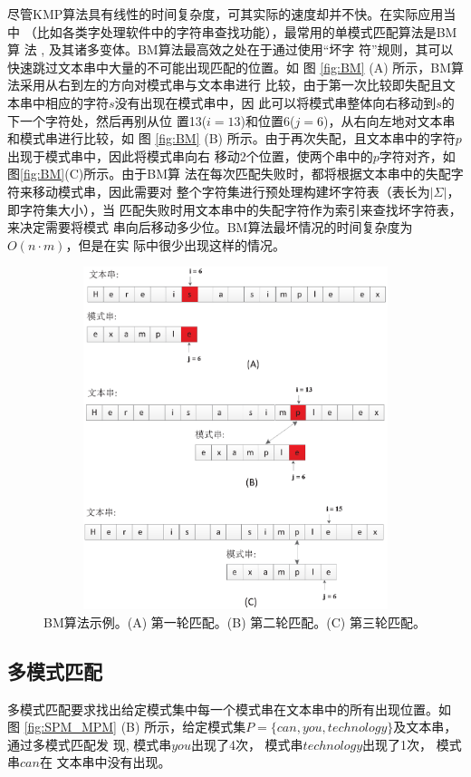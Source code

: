 尽管KMP算法具有线性的时间复杂度，可其实际的速度却并不快。在实际应用当中
（比如各类字处理软件中的字符串查找功能），最常用的单模式匹配算法是BM算
法 \cite{Boyer1977}, 及其诸多变体。BM算法最高效之处在于通过使用“坏字
符”规则，其可以快速跳过文本串中大量的不可能出现匹配的位置。如
图 \ref{fig:BM} (A) 所示，BM算法采用从右到左的方向对模式串与文本串进行
比较，由于第一次比较即失配且文本串中相应的字符$s$没有出现在模式串中，因
此可以将模式串整体向右移动到$s$的下一个字符处，然后再别从位
置13($i=13$)和位置6($j=6$)，从右向左地对文本串和模式串进行比较，如
图 \ref{fig:BM} (B)
所示。由于再次失配，且文本串中的字符$p$出现于模式串中，因此将模式串向右
移动2个位置，使两个串中的$p$字符对齐，如图\ref{fig:BM}(C)所示。由于BM算
法在每次匹配失败时，都将根据文本串中的失配字符来移动模式串，因此需要对
整个字符集进行预处理构建坏字符表（表长为$|\Sigma|$，即字符集大小），当
匹配失败时用文本串中的失配字符作为索引来查找坏字符表，来决定需要将模式
串向后移动多少位。BM算法最坏情况的时间复杂度为$O(n \cdot m)$，但是在实
际中很少出现这样的情况。

\begin{figure}[!h]
  \centering
  \includegraphics[height=10cm ,width=12cm]{figures/1_Introduction/BM.eps}
  \caption{BM算法示例。(A) 第一轮匹配。(B) 第二轮匹配。(C) 第三轮匹配。}
  \label{fig:KMP}
\end{figure}

\subsection{多模式匹配}

多模式匹配要求找出给定模式集中每一个模式串在文本串中的所有出现位置。如
图 \ref{fig:SPM_MPM} (B)
所示，给定模式集$P=\{can, you, technology\}$及文本串，通过多模式匹配发
现, 模式串$you$出现了4次， 模式串$technology$出现了1次， 模式串$can$在
文本串中没有出现。

